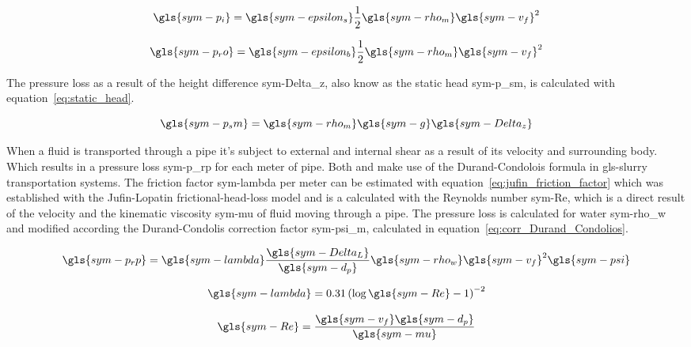 \begin{equation}\label{eq:loss_inlet}
	\gls{sym-p_i} = \gls{sym-epsilon_s} \frac{1}{2} \gls{sym-rho_m} \gls{sym-v_f}^2
\end{equation}

\begin{equation}\label{eq:appendages_loss}
	\gls{sym-p_ro} = \gls{sym-epsilon_b} \frac{1}{2} \gls{sym-rho_m} \gls{sym-v_f}^2
\end{equation}

\noindent The pressure loss as a result of the height difference \gls{sym-Delta_z}, also know as the static head
\gls{sym-p_sm}, is calculated with equation~\ref{eq:static_head}.

\begin{equation}\label{eq:static_head}
	\gls{sym-p_sm} = \gls{sym-rho_m} \gls{sym-g} \gls{sym-Delta_z}
\end{equation}

When a fluid is transported through a pipe it's subject to external and internal shear as a result of its velocity and
surrounding body. Which results in a pressure loss \gls{sym-p_rp} for each meter of pipe. Both
\citet{van_den_berg_ihc_2013} and \citet{miedema_slurry_2016} make use of the Durand-Condolois formula in
\gls{gls-slurry} transportation systems. The friction factor \gls{sym-lambda} per meter can be estimated with
equation~\ref{eq:jufin_friction_factor} which was established with the Jufin-Lopatin frictional-head-loss model and is a
calculated with the Reynolds number \gls{sym-Re}, which is a direct result of the velocity and the kinematic viscosity
\gls{sym-mu} of fluid moving through a pipe. The pressure loss is calculated for water \gls{sym-rho_w} and modified
according the Durand-Condolis correction factor \gls{sym-psi_m}, calculated in equation~\ref{eq:corr_Durand_Condolios}.

\begin{equation}\label{eq:loss_due_length}
	\gls{sym-p_rp} = \gls{sym-lambda} \frac{\gls{sym-Delta_L}}{\gls{sym-d_p}} \gls{sym-rho_w} \gls{sym-v_f}^2 \gls{sym-psi}
\end{equation}

\begin{equation}\label{eq:jufin_friction_factor}
	\gls{sym-lambda} =  0.31 \left(\log \gls{sym-Re} - 1\right)^{-2}
\end{equation}

\begin{equation}\label{eq:reynoldsnumber}
	\gls{sym-Re} = \frac{\gls{sym-v_f} \gls{sym-d_p}}{\gls{sym-mu}}
\end{equation}

